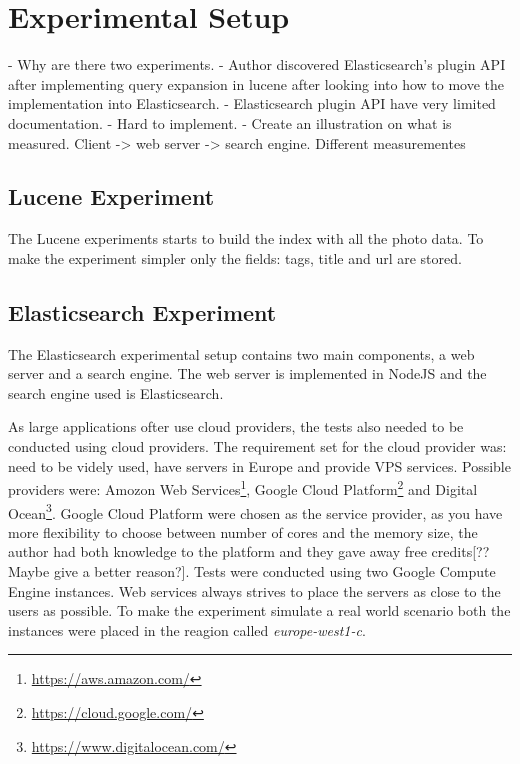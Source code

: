 \section{Experimental Setup}
- Why are there two experiments.
- Author discovered Elasticsearch's plugin API after implementing query expansion in lucene after looking into how to move the implementation into Elasticsearch.
- Elasticsearch plugin API have very limited documentation.
- Hard to implement.
- Create an illustration on what is measured. Client -> web server -> search engine. Different measurementes

\subsection{Lucene Experiment}
The Lucene experiments starts to build the index with all the photo data.
To make the experiment simpler only the fields: tags, title and url are stored.

\subsection{Elasticsearch Experiment}
The Elasticsearch experimental setup contains two main components, a web server and a search engine.
The web server is implemented in NodeJS and the search engine used is Elasticsearch.

As large applications ofter use cloud providers, the tests also needed to be conducted using cloud providers.
The requirement set for the cloud provider was: need to be videly used, have servers in Europe and provide VPS services.
Possible providers were: Amozon Web Services\footnote{\url{https://aws.amazon.com/}},
Google Cloud Platform\footnote{\url{https://cloud.google.com/}} and Digital Ocean\footnote{\url{https://www.digitalocean.com/}}.
Google Cloud Platform were chosen as the service provider, as you have more flexibility to choose between number of cores and the memory size,
the author had both knowledge to the platform and they gave away free credits[?? Maybe give a better reason?].
Tests were conducted using two Google Compute Engine instances.
Web services always strives to place the servers as close to the users as possible.
To make the experiment simulate a real world scenario both the instances were placed in the reagion called \textit{europe-west1-c}.


